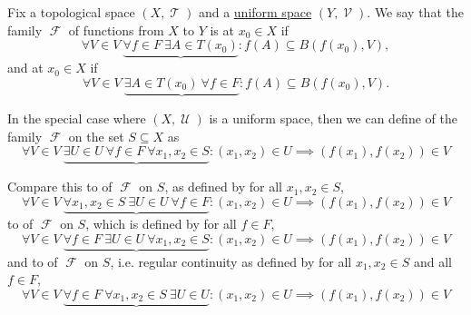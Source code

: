 \begin{definition}\label{def:function_set_continuity}
  Fix a topological space \( (X, \mscrT) \) and a \hyperref[def:uniform_space]{uniform space} \( (Y, \mscrV) \). We say that the family \( \mscrF \) of functions from \( X \) to \( Y \) is  at \( x_0 \in X \) if
  \begin{equation}\label{def:function_set_continuity/functionwise}
    \forall V \in V \ \underbrace{\forall f \in F \ \exists A \in T(x_0)} : f(A) \subseteq B(f(x_0), V),
  \end{equation}
  and  at \( x_0 \in X \) if
  \begin{equation}\label{def:function_set_continuity/equicontinuous}
    \forall V \in V \ \underbrace{\exists A \in T(x_0) \ \forall f \in F} : f(A) \subseteq B(f(x_0), V).
  \end{equation}

  In the special case where \( (X, \mscrU) \) is a uniform space, then we can define  of the family \( \mscrF \) on the set \( S \subseteq X \) as
  \begin{equation}\label{def:function_set_continuity/uniform_equicontinuous}
    \forall V \in V \ \underbrace{\exists U \in U \ \forall f \in F \ \forall x_1, x_2 \in S} : (x_1, x_2) \in U \implies (f(x_1), f(x_2)) \in V
  \end{equation}

  Compare this to  of \( \mscrF \) on \( S \), as defined by  for all \( x_1, x_2 \in S \),
  \begin{equation}\label{def:function_set_continuity/pointwise_equicontinuous}
    \forall V \in V \ \underbrace{\forall x_1, x_2 \in S \ \exists U \in U \ \forall f \in F} : (x_1, x_2) \in U \implies (f(x_1), f(x_2)) \in V
  \end{equation}
  to  of \( \mscrF \) on \( S \), which is defined by  for all \( f \in F \),
  \begin{equation}\label{def:function_set_continuity/uniform_functionwise}
    \forall V \in V \ \underbrace{\forall f \in F \ \exists U \in U \ \forall x_1, x_2 \in S} : (x_1, x_2) \in U \implies (f(x_1), f(x_2)) \in V
  \end{equation}
  and to  of \( \mscrF \) on \( S \), i.e. regular continuity as defined by  for all \( x_1, x_2 \in S \) and all \( f \in F \),
  \begin{equation}\label{def:function_set_continuity/functionwise_pointwise}
    \forall V \in V \ \underbrace{\forall f \in F \ \forall x_1, x_2 \in S \ \exists U \in U} : (x_1, x_2) \in U \implies (f(x_1), f(x_2)) \in V
  \end{equation}
\end{definition}

